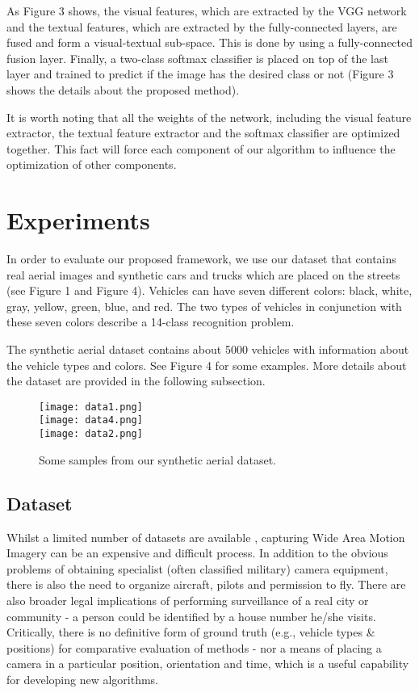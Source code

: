 \documentclass[conference]{IEEEtran}
\begin{document}
As Figure 3 shows, the visual features, which are extracted by the VGG network and the textual features, which are extracted by the fully-connected layers, are fused and form a visual-textual sub-space. This is done by using a fully-connected fusion layer. Finally, a two-class softmax classifier is placed on top of the last layer and trained to predict if the image has the desired class or not (Figure 3 shows the details about the proposed method).

It is worth noting that all the weights of the network, including the visual feature extractor, the textual feature extractor and the softmax classifier are optimized together. This fact will force each component of our algorithm to influence the optimization of other components.\\

\section{Experiments}
In order to evaluate our proposed framework, we use our dataset that contains real aerial images and synthetic cars and trucks which are placed on the streets (see Figure 1 and Figure 4). Vehicles can have seven different colors: black, white, gray, yellow, green, blue, and red. The two types of vehicles in conjunction with these seven colors describe a 14-class recognition problem.

The synthetic aerial dataset contains about 5000 vehicles with information about the vehicle types and colors. See Figure 4 for some examples. More details about the dataset are provided in the following subsection. \\

\begin{figure}[!t]
\centering
\texttt{[image: data1.png]}
\\
\vspace{5mm}
 \texttt{[image: data4.png]}
 \\
\vspace{5mm}
 \texttt{[image: data2.png]}
\caption{Some samples from our synthetic aerial dataset.}
\label{fig_graph8}
\end{figure}

\subsection{Dataset}
Whilst a limited number of datasets are available \cite{wamidatasets}, capturing Wide Area Motion Imagery can be an expensive and difficult process.  In addition to the obvious problems of obtaining specialist (often classified military) camera equipment, there is also the need to organize aircraft, pilots and permission to fly.  There are also broader legal implications of performing surveillance of a real city or community - a person could be identified by a house number he/she visits. Critically, there is no definitive form of ground truth (e.g., vehicle types \& positions) for comparative evaluation of methods - nor a means of placing a camera in a particular position, orientation and time, which is a useful capability for developing new algorithms.
\end{document}
